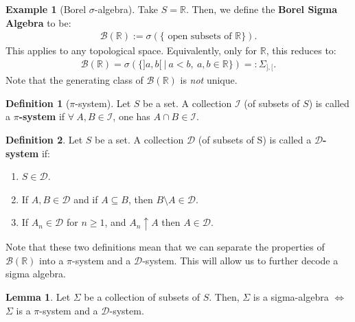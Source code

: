 \documentclass[11pt]{article}
\theoremstyle{definition}
\newtheorem{ex}{Example}[section]
\newtheorem{defn}{Definition}[section]
\newtheorem{lem}{Lemma}[section]
\theoremstyle{theorem}
\newcommand{\R}[0]{\mathbb{R}}
\newcommand{\borel}[0]{\mathcal{B}(\R)}
\newcommand{\dsys}[0]{\mathcal{D}}
\begin{document}
\begin{ex}[Borel \( \sigma \)-algebra]
	Take \( S = \R \). Then, we define the \textbf{Borel Sigma Algebra} to be: 
	\begin{align}
		\borel := \sigma( \{ \text{ open subsets of } \R \} ).
	\end{align}
	This applies to any topological space. Equivalently, only for \( \R \), this reduces to: 
	\begin{align}
		\borel = \sigma ( \{ ]a, b [\ |\ a < b,\ a, b \in \R \} ) =: \Sigma_{], [}.
	\end{align}
	Note that the generating class of \( \borel \) is \emph{not} unique.
\end{ex}

\begin{defn}[\( \pi \)-system]
	Let \( S \) be a set. A collection \( \mathcal{I} \) (of subsets of \( S \)) is called a \textbf{\( \pi \)-system} if \( \forall\ A, B \in \mathcal{I} \), one has \( A \cap B \in \mathcal{I} \).
\end{defn}
\begin{defn}
Let \( S \) be a set. A collection \( \dsys \) (of subsets of S) is called a \textbf{\( \dsys \)-system} if: 
\begin{enumerate}[noitemsep]
	\item \( S \in \dsys \). 
	\item If \( A, B \in \dsys \) and if \( A \subseteq B \), then \( B \setminus A \in \dsys \).
	\item If \( A_n \in \dsys \) for \( n \geq 1 \), and \( A_n \uparrow A \) then \( A \in \dsys \).
\end{enumerate}	
\end{defn}

Note that these two definitions mean that we can separate the properties of \( \borel \) into a \( \pi \)-system and a \( \dsys \)-system. This will allow us to further decode a sigma algebra. 

\begin{lem}
Let \( \Sigma \) be a collection of subsets of \( S \). Then, \( \Sigma \) is a sigma-algebra \( \iff \) \( \Sigma \) is a \( \pi \)-system and a \( \dsys \)-system.	
\end{lem}
\end{document}
